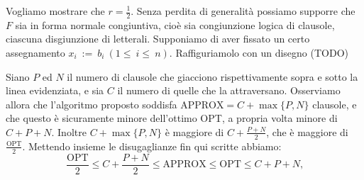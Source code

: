Vogliamo mostrare che \(r = \frac{1}{2}\). Senza perdita di generalit\`a
possiamo supporre che \(F\) sia in forma normale congiuntiva, cio\`e sia
congiunzione logica di clausole, ciascuna disgiunzione di letterali.
Supponiamo di aver fissato un certo assegnamento \(x_i~:=~b_i~(1\le~i\le~n)\).
Raffiguriamolo con un disegno (TODO)
\begin{figure}[H]
  \centering
\end{figure}

Siano \(P\) ed \(N\) il numero di clausole che giacciono rispettivamente sopra
e sotto la linea evidenziata, e sia \(C\) il numero di quelle che la 
attraversano. Osserviamo allora che l'algoritmo proposto soddisfa 
\(\text{APPROX} = C+\max\{P,N\}\) clausole, e che questo \`e sicuramente 
minore dell'ottimo OPT, a propria volta minore di \(C+P+N\). Inoltre 
\(C+\max\{P,N\}\) \`e maggiore di \(C+\frac{P+N}{2}\), che \`e maggiore di 
\(\frac{\text{OPT}}{2}\). Mettendo insieme le disugaglianze fin qui scritte 
abbiamo: \[\frac{\text{OPT}}{2}\le C+\frac{P+N}{2}\le\text{APPROX}\le
\text{OPT}\le C+P+N\text{,}\]
